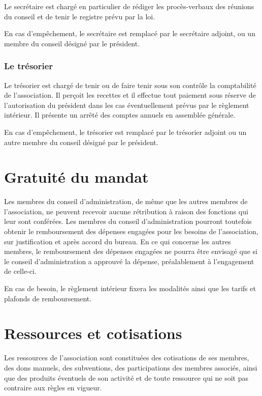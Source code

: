 \documentclass[a4wide,12pt]{scrartcl}
\begin{document}
Le secrétaire est chargé en particulier de rédiger les procès-verbaux
des réunions du conseil et de tenir le registre prévu par la loi.

En cas d'empêchement, le secrétaire est remplacé par le secrétaire
adjoint, ou un membre du conseil désigné par le président.

\subsubsection*{Le trésorier}

Le trésorier est chargé de tenir ou de faire tenir sous son contrôle
la comptabilité de l'association. Il perçoit les recettes et il
effectue tout paiement sous réserve de l'autorisation du président
dans les cas éventuellement prévus par le règlement intérieur. Il
présente un arrêté des comptes annuels en assemblée générale.

En cas d'empêchement, le trésorier est remplacé par le trésorier
adjoint ou un autre membre du conseil désigné par le président.

\section{Gratuité du mandat}

Les membres du conseil d'administration, de même que les autres
membres de l'association, ne peuvent recevoir aucune rétribution à
raison des fonctions qui leur sont conférées. Les membres du conseil
d'administration pourront toutefois obtenir le remboursement des
dépenses engagées pour les besoins de l'association, sur justification
et après accord du bureau. En ce qui concerne les autres membres, le
remboursement des dépenses engagées ne pourra être envisagé que si le
conseil d'administration a approuvé la dépense, préalablement à
l'engagement de celle-ci.

En cas de besoin, le règlement intérieur fixera les modalités ainsi
que les tarifs et plafonds de remboursement.
 
\section{Ressources et cotisations}

Les ressources de l'association sont constituées des cotisations de
ses membres, des dons manuels, des subventions, des participations des
membres associés, ainsi que des produits éventuels de son activité et
de toute ressource qui ne soit pas contraire aux règles en vigueur.
\end{document}
